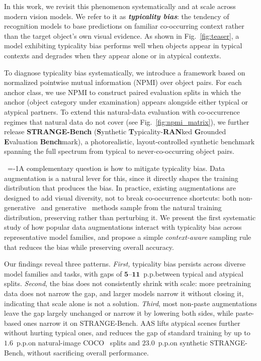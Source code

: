 

In this work, we revisit this phenomenon systematically and at scale across modern vision models. We refer to it as \textit{\textbf{typicality bias}}: the tendency of recognition models to base predictions on familiar co-occurring context rather than the target object's own visual evidence. As shown in Fig.~\ref{fig:teaser}, a model exhibiting typicality bias performs well when objects appear in typical contexts and degrades when they appear alone or in atypical contexts.

To diagnose typicality bias systematically, we introduce a framework based on normalized pointwise mutual information (NPMI) over object pairs. For each anchor class, we use NPMI to construct paired evaluation splits in which the anchor (object category under examination) appears alongside either typical or atypical partners. To extend this natural-data evaluation with co-occurrence regimes that natural data do not cover (see Fig.~\ref{fig:npmi_matrix}), we further release \textbf{STRANGE-Bench} (\textbf{S}ynthetic \textbf{T}ypicality-\textbf{RAN}ked \textbf{G}rounded \textbf{E}valuation \textbf{Bench}mark), a photorealistic, layout-controlled synthetic benchmark spanning the full spectrum from typical to never-co-occurring object pairs.

~\looseness=-1A complementary question is how to mitigate typicality bias. Data augmentation is a natural lever for this, since it directly shapes the training distribution that produces the bias. In practice, existing augmentations are designed to add visual diversity, not to break co-occurrence shortcuts: both non-generative~\cite{bochkovskiy2020yolov4,zhang2017mixup,ghiasi2021simple} and generative~\cite{zhao2023x,kupyn2024dataset,xie2025mosaicfusion} methods sample from the natural training distribution, preserving rather than perturbing it. We present the first systematic study of how popular data augmentations interact with typicality bias across representative model families, and propose a simple \emph{context-aware} sampling rule that reduces the bias while preserving overall accuracy.

Our findings reveal three patterns. \textit{First,} typicality bias persists across diverse model families and tasks, with gaps of $\mathbf{5}$--$\mathbf{11}$~p.p.\@ between typical and atypical splits. \textit{Second}, the bias does not consistently shrink with scale: more pretraining data does not narrow the gap, and larger models narrow it without closing it, indicating that scale alone is not a solution. \textit{Third}, most non-paste augmentations leave the gap largely unchanged or narrow it by lowering both sides, while paste-based ones narrow it on STRANGE-Bench. AAS lifts atypical scenes further without hurting typical ones, and reduces the gap of standard training by up to $\mathbf{1.6}$~p.p.\@ on natural-image COCO~\cite{mscoco14} splits and $\mathbf{23.0}$~p.p.\@ on synthetic STRANGE-Bench, without sacrificing overall performance.

